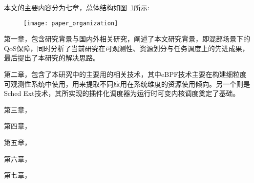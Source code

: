 本文的主要内容分为七章，总体结构如图~\ref{fig:paper_organization}所示:

\begin{figure}[!htbp]
    \centering
    \texttt{[image: paper\_organization]}
    \label{fig:paper_organization}
\end{figure}

第一章，包含研究背景与国内外相关研究，阐述了本文研究背景，即混部场景下的QoS保障，同时分析了当前研究在可观测性、资源划分与任务调度上的先进成果，最后提出了本研究的解决思路。

第二章，包含了本研究中的主要用的相关技术，其中eBPF技术主要在构建细粒度可观测性系统中使用，用来提取不同应用在系统维度的资源使用倾向。另一个则是Sched Ext技术，其所实现的插件化调度器为运行时可变内核调度奠定了基础。

第三章，

第四章，

第五章，

第六章，

第七章，